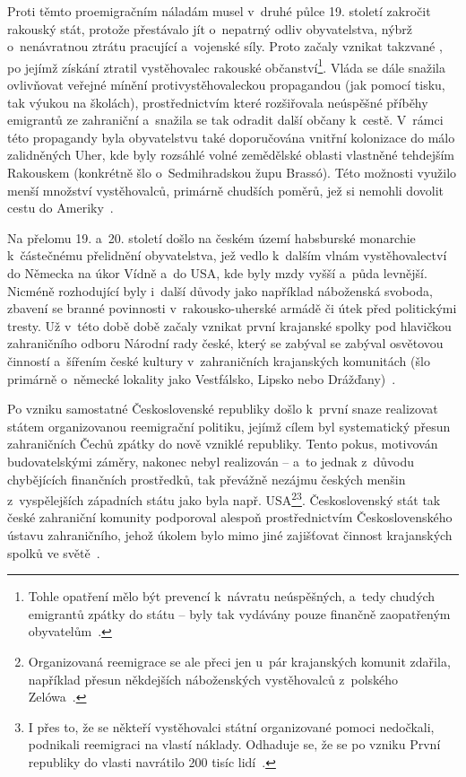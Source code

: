 Proti těmto proemigračním náladám musel v~druhé půlce 19. století zakročit rakouský stát, protože přestávalo jít o~nepatrný odliv obyvatelstva, nýbrž o~nenávratnou ztrátu pracující a~vojenské síly. Proto začaly vznikat takzvané , po jejímž získání ztratil vystěhovalec rakouské občanství\footnote{Tohle opatření mělo být prevencí k~návratu neúspěšných, a~tedy chudých emigrantů zpátky do státu – byly tak vydávány pouze finančně zaopatřeným obyvatelům~\parencite{Vaculik2002}.}. Vláda se dále snažila ovlivňovat veřejné mínění protivystěhovaleckou propagandou (jak pomocí tisku, tak výukou na školách), prostřednictvím které rozšiřovala neúspěšné příběhy emigrantů ze zahraniční a~snažila se tak odradit další občany k~cestě. V~rámci této propagandy byla obyvatelstvu také doporučována vnitřní kolonizace do málo zalidněných Uher, kde byly rozsáhlé volné zemědělské oblasti vlastněné tehdejším Rakouskem (konkrétně šlo o~Sedmihradskou župu Brassó). Této možnosti využilo menší množství vystěhovalců, primárně chudších poměrů, jež si nemohli dovolit cestu do Ameriky~\parencite{Vaculik2009b}.

Na přelomu 19. a~20. století došlo na českém území habsburské monarchie k~částečnému přelidnění obyvatelstva, jež vedlo k~dalším vlnám vystěhovalectví do Německa na úkor Vídně a~do USA, kde byly mzdy vyšší a~půda levnější. Nicméně rozhodující byly i~další důvody jako například náboženská svoboda, zbavení se branné povinnosti v~rakousko-uherské armádě či útek před politickými tresty. Už v~této době době začaly vznikat první krajanské spolky pod hlavičkou zahraničního odboru Národní rady české, který se zabýval se zabýval osvětovou činností a~šířením české kultury v~zahraničních krajanských komunitách (šlo primárně o~německé lokality jako Vestfálsko, Lipsko nebo Drážďany)~\parencite{Vaculik2009b}.

Po vzniku samostatné Československé republiky došlo k~první snaze realizovat státem organizovanou reemigrační politiku, jejímž cílem byl systematický přesun zahraničních Čechů zpátky do nově vzniklé republiky. Tento pokus, motivován budovatelskými záměry, nakonec nebyl realizován -- a~to jednak z~důvodu chybějících finančních prostředků, tak převážně nezájmu českých menšin z~vyspělejších západních státu jako byla např. USA\footnote{Organizovaná reemigrace se ale přeci jen u~pár krajanských komunit zdařila, například přesun někdejších náboženských vystěhovalců z~polského Zelówa~\parencite{Nespor2005}.}\footnote{I přes to, že se někteří vystěhovalci státní organizované pomoci nedočkali, podnikali reemigraci na vlastí náklady. Odhaduje se, že se po vzniku První republiky do vlasti navrátilo 200 tisíc lidí~\parencite{Vaculik2009b}.}. Československý stát tak české zahraniční komunity podporoval alespoň prostřednictvím Československého ústavu zahraničního, jehož úkolem bylo mimo jiné zajišťovat činnost krajanských spolků ve světě~\parencite{Nespor2005}.


